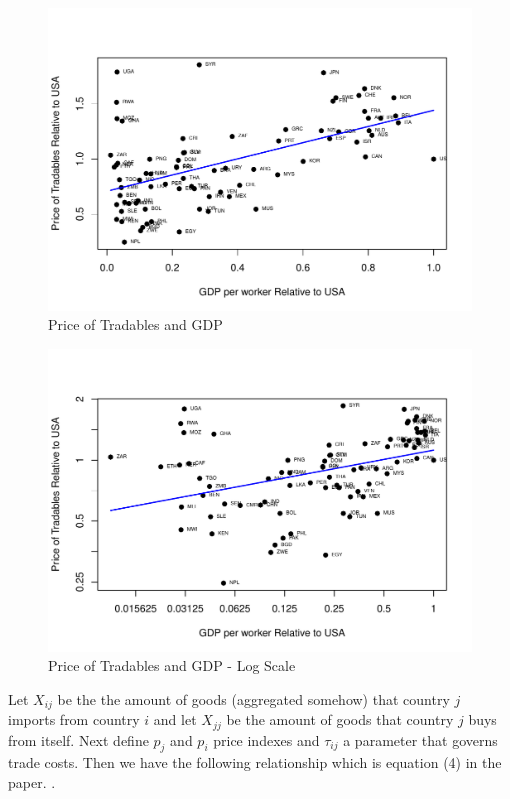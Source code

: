 \documentclass[a4paper,12pt]{article}
\begin{document}
 \begin{figure}[htbp!]
     \centering
     \includegraphics[scale=0.75]{raw_scatterplot_figure_1.pdf}
     \caption{Price of Tradables and GDP}
     \label{raw_scatterplot_figure_1_prices_and_GDP}
 \end{figure}
 
  \begin{figure}[htbp!]
     \centering
     \includegraphics[scale=0.75]{scatterplot_figure_1.pdf}
     \caption{Price of Tradables and GDP - Log Scale}
     \label{scatterplot_figure_1_prices_and_GDP}
 \end{figure}
 
 Let $X_{ij}$ be the the amount of goods (aggregated somehow) that country $j$ imports from country $i$ and let $X_{jj}$ be the amount of goods that country $j$ buys from itself. Next define $p_j$ and $p_i$ price indexes and $\tau_{ij}$ a parameter that governs trade costs. Then we have the following relationship which is equation (4) in the paper. . 
 
\end{document}
